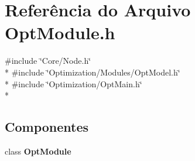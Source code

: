 \section{Referência do Arquivo Opt\+Module.\+h}
\label{_opt_module_8h}
{\ttfamily \#include \char`\"{}Core/\+Node.\+h\char`\"{}}\\*
{\ttfamily \#include \char`\"{}Optimization/\+Modules/\+Opt\+Model.\+h\char`\"{}}\\*
{\ttfamily \#include \char`\"{}Optimization/\+Opt\+Main.\+h\char`\"{}}\\*
\subsection*{Componentes}
\begin{DoxyCompactItemize}
\item 
class {\bf Opt\+Module}
\end{DoxyCompactItemize}
